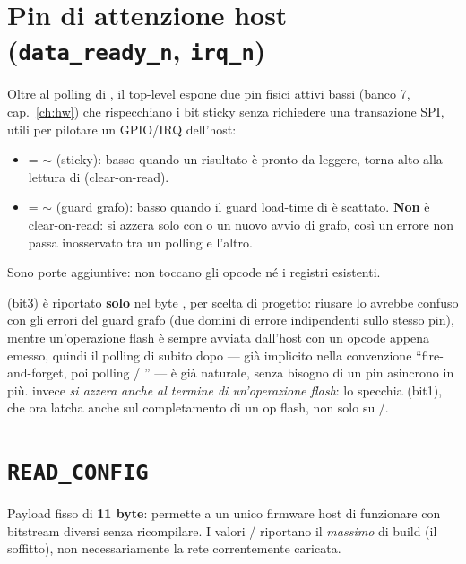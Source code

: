 \section{Pin di attenzione host (\texttt{data\_ready\_n}, \texttt{irq\_n})}
Oltre al polling di , il top-level espone due pin fisici attivi bassi (banco 7,
cap.~\ref{ch:hw}) che rispecchiano i bit sticky senza richiedere una transazione SPI,
utili per pilotare un GPIO/IRQ dell'host:
\begin{itemize}
\item {} = $\sim$ (sticky): basso quando un risultato è
pronto da leggere, torna alto alla lettura di  (clear-on-read).
\item {} = $\sim$ (guard grafo): basso quando il guard load-time
di  è scattato. \textbf{Non} è clear-on-read: si azzera solo con
 o un nuovo avvio di grafo, così un errore non passa inosservato tra un polling e
l'altro.
\end{itemize}
Sono porte aggiuntive: non toccano gli opcode né i registri esistenti.

\begin{fnwarn}
 (bit3) è riportato \textbf{solo} nel byte , per scelta
di progetto: riusare  lo avrebbe confuso con gli errori del guard grafo (due
domini di errore indipendenti sullo stesso pin), mentre un'operazione flash è sempre
avviata dall'host con un opcode appena emesso, quindi il polling di  subito dopo
--- già implicito nella convenzione ``fire-and-forget, poi polling /
'' --- è già naturale, senza bisogno di un pin asincrono in più.
 invece \emph{si azzera anche al termine di un'operazione flash}: lo
specchia  (bit1), che ora latcha anche sul completamento di un op flash,
non solo su /.
\end{fnwarn}

\section{\texttt{READ\_CONFIG}}
\label{sec:readcfg}
Payload fisso di \textbf{11 byte}: permette a un unico firmware host di funzionare con
bitstream diversi senza ricompilare. I valori / riportano
il \emph{massimo} di build (il soffitto), non necessariamente la rete correntemente
caricata.

